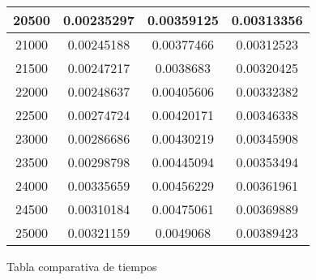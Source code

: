 \documentclass{article}
\begin{document}
\begin{longtable}{|c|c|c|c|}
		    20500  &  0.00235297    & 	0.00359125	 &  0.00313356  \\ \hline
		    21000  &  0.00245188    & 	0.00377466	 &  0.00312523  \\ \hline
		    21500  &  0.00247217    & 	0.0038683	 &  0.00320425  \\ \hline
		    22000  &  0.00248637    & 	0.00405606	 &  0.00332382  \\ \hline
		    22500  &  0.00274724    & 	0.00420171	 &  0.00346338  \\ \hline
		    23000  &  0.00286686    & 	0.00430219	 &  0.00345908  \\ \hline
	     	23500  &  0.00298798    & 	0.00445094	 &  0.00353494  \\ \hline
		    24000  &  0.00335659    & 	0.00456229	 &  0.00361961  \\ \hline
		    24500  &  0.00310184    & 	0.00475061	 &  0.00369889  \\ \hline
		    25000  &  0.00321159    & 	0.0049068	 &  0.00389423  \\ \hline
		\end{longtable}
		\begin{center}
		\tiny Tabla comparativa de tiempos
		\end{center}
\end{document}
